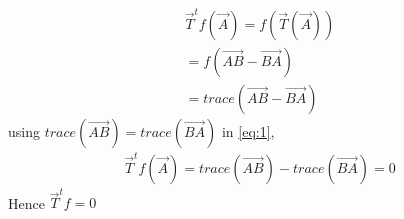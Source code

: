 \begin{align}
\vec{T}^tf(\vec{A})=f(\vec{T}(\vec{A}))\\
= f(\vec{AB} - \vec{BA})\\
=trace(\vec{AB} - \vec{BA})\label{eq:1}
\end{align}
using $trace(\vec{AB})=trace(\vec{BA})$ in \eqref{eq:1},
\begin{align}
\vec{T}^tf(\vec{A}) = trace(\vec{AB}) - trace(\vec{BA})= 0
\end{align}
Hence $\vec{T}^tf = 0$
